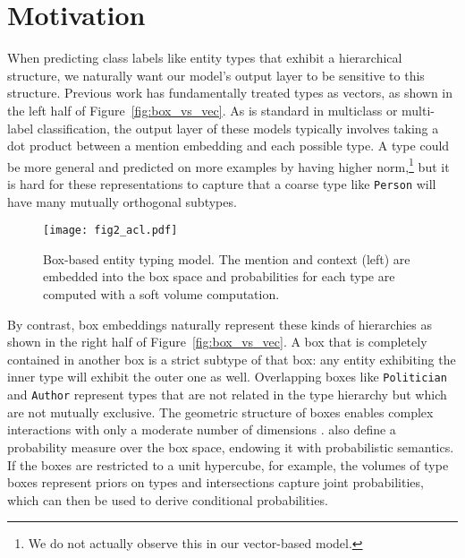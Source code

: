 \documentclass[11pt,a4paper]{article}
\begin{document}
\section{Motivation}\label{sec:motivation}

When predicting class labels like entity types that exhibit a hierarchical structure, we naturally want our model's output layer to be sensitive to this structure. Previous work \cite[inter alia]{Xiang_Ren_16a,sonse_shimaoka_17,Eunsol_Choi_18,Yasumasa_Onoe_19} has fundamentally treated types as vectors, as shown in the left half of Figure~\ref{fig:box_vs_vec}. As is standard in multiclass or multi-label classification, the output layer of these models typically involves taking a dot product between a mention embedding and each possible type. A type could be more general and predicted on more examples by having higher norm,\footnote{We do not actually observe this in our vector-based model.} but it is hard for these representations to capture that a coarse type like {\tt Person} will have many mutually orthogonal subtypes.




\begin{figure*}[!t]
    \centering
    \texttt{[image: fig2\_acl.pdf]}
    \caption{Box-based entity typing model. The mention and context (left) are embedded into the box space and probabilities for each type are computed with a soft volume computation.}
    \label{fig:box_classifier}
    \vspace{-3pt}
\end{figure*}




By contrast, box embeddings naturally represent these kinds of hierarchies as shown in the right half of Figure~\ref{fig:box_vs_vec}. A box that is completely contained in another box is a strict subtype of that box: any entity exhibiting the inner type will exhibit the outer one as well. Overlapping boxes like {\tt Politician} and {\tt Author} represent types that are not related in the type hierarchy but which are not mutually exclusive.
The geometric structure of boxes enables complex interactions with only a moderate number of dimensions \cite{Shib_Sankar_Dasgupta_20}.
\citet{Luke_Vilnis_18}
also define a probability measure over the box space, endowing it with probabilistic semantics. If the boxes are restricted to a unit hypercube, for example, the volumes of type boxes represent priors on types and intersections capture joint probabilities, which can then be used to derive conditional probabilities.
\end{document}
